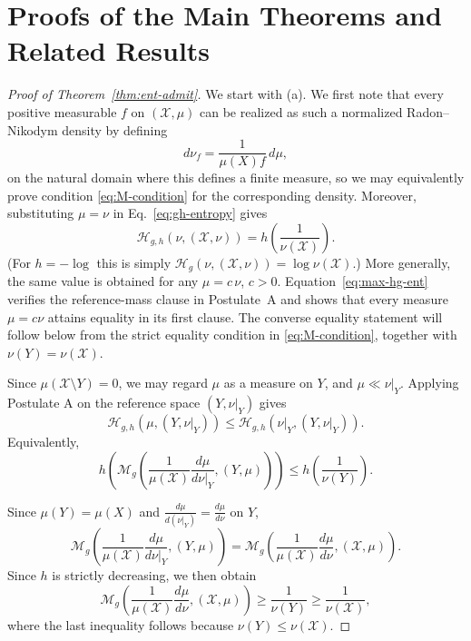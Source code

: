 \documentclass[reqno]{amsart}
\begin{document}
\vspace{1em}




\section{Proofs of the Main Theorems and Related Results}
\label{sec:proofs}


\begin{proof}[Proof of Theorem~\ref{thm:ent-admit}]

We start with (a). We first note that every positive measurable $f$ on $(\mathcal{X},\mu)$ can be realized
as such a normalized Radon--Nikodym density by defining
$$
d\nu_f=\frac{1}{\mu(X)f}\,d\mu,
$$
on the natural domain where this defines a finite measure, so we may equivalently prove condition \eqref{eq:M-condition} for the corresponding density. 
Moreover, substituting $\mu = \nu$ in Eq.~\eqref{eq:gh-entropy} gives
\begin{equation}
\label{eq:max-hg-ent}
\mathcal H_{g,h}(\nu,(\mathcal X,\nu))
=
h\left(\frac{1}{\nu(\mathcal X)}\right).
\end{equation}
(For $h=-\log$ this is simply $\mathcal H_g(\nu,(\mathcal X,\nu)) = \log \nu(\mathcal X)$.)
More generally, the same value is obtained for any $\mu = c\,\nu$, $c>0$. 
Equation~\eqref{eq:max-hg-ent} verifies the reference-mass clause in Postulate~A and shows that every measure $\mu=c\nu$ attains equality in its first clause. The converse equality statement will follow below from the strict equality condition in \eqref{eq:M-condition}, together with $\nu(Y)=\nu(\mathcal X)$.




Since $\mu(\mathcal{X}\setminus Y)=0$, we may regard $\mu$ as a measure on
$Y$, and $\mu\ll\nu|_Y$. Applying Postulate A on the reference space
$(Y,\nu|_Y)$ gives
$$
\mathcal{H}_{g,h}(\mu,(Y,\nu|_Y))
\leq
\mathcal{H}_{g,h}(\nu|_Y,(Y,\nu|_Y)).
$$
Equivalently,
\begin{equation}
\label{eq:h-monotone}
h\left(
\mathcal{M}_g \left(
\frac{1}{\mu(\mathcal X)}
\frac{d\mu}{d\nu|_Y},
(Y,\mu)
\right)
\right)
\leq
h\left(\frac{1}{\nu(Y)}\right).
\end{equation}

Since $\mu(Y)=\mu(X)$ and $\frac{d\mu}{d(\nu|_Y)} =\frac{d\mu}{d\nu}$
on $Y$,  
$$
\mathcal{M}_g \left(
\frac{1}{\mu(\mathcal X)}
\frac{d\mu}{d\nu|_Y},
(Y,\mu)
\right) = \mathcal{M}_g \left(
\frac{1}{\mu(\mathcal{X})}
\frac{d\mu}{d\nu},
(\mathcal{X},\mu)
\right) .
$$
Since $h$ is strictly decreasing,  we then obtain
\begin{equation}
\label{ineq:M-condition}
\mathcal{M}_g \left(
\frac{1}{\mu(\mathcal{X})}
\frac{d\mu}{d\nu},
(\mathcal{X},\mu)
\right)
\geq 
\frac{1}{\nu(Y)}
\geq
\frac{1}{\nu(\mathcal{X})},
\end{equation}
where the last inequality follows because $\nu(Y) \leq \nu(\mathcal{X})$.



\end{proof}
\end{document}
